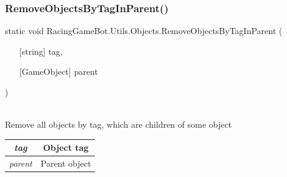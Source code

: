 \subsubsection{\texorpdfstring{RemoveObjectsByTagInParent()}{RemoveObjectsByTagInParent()}}
{\footnotesize\ttfamily static void RacingGameBot.Utils.Objects.RemoveObjectsByTagInParent (\begin{itemize}
    \item[] [{string}]{ tag, }
    \item[] [{GameObject}]{ parent }
\end{itemize}\hspace{0.5cm})}\\
Remove all objects by tag, which are children of some object \\
\begin{tabular}{|c|c|}
\hline
{\em tag} & Object tag\\
\hline
{\em parent} & Parent object\\
\hline
\end{tabular}

